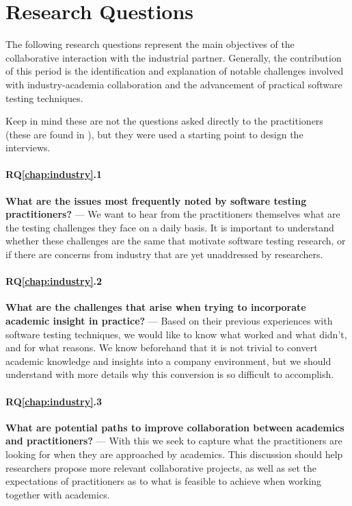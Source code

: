 \section{Research Questions}
\label{sec:ind_rqs}

The following research questions represent the main objectives of the collaborative interaction with the industrial partner.
Generally, the contribution of this period is the identification and explanation of notable challenges involved with industry-academia collaboration and the advancement of practical software testing techniques.

Keep in mind these are not the questions asked directly to the practitioners (these are found in ), but they were used a starting point to design the interviews.

\paragraph{RQ\ref{chap:industry}.1}\label{rq:ind1} \textbf{What are the issues most frequently noted by software testing practitioners?} --- We want to hear from the practitioners themselves what are the testing challenges they face on a daily basis.
It is important to understand whether these challenges are the same that motivate software testing research, or if there are concerns from industry that are yet unaddressed by researchers.

\paragraph{RQ\ref{chap:industry}.2}\label{rq:ind2} \textbf{What are the challenges that arise when trying to incorporate academic insight in practice?} --- Based on their previous experiences with software testing techniques, we would like to know what worked and what didn't, and for what reasons.
We know beforehand that it is not trivial to convert academic knowledge and insights into a company environment, but we should understand with more details why this conversion is so difficult to accomplish.

\paragraph{RQ\ref{chap:industry}.3}\label{rq:ind3} \textbf{What are potential paths to improve collaboration between academics and practitioners?} --- With this we seek to capture what the practitioners are looking for when they are approached by academics.
This discussion should help researchers propose more relevant collaborative projects, as well as set the expectations of practitioners as to what is feasible to achieve when working together with academics.

